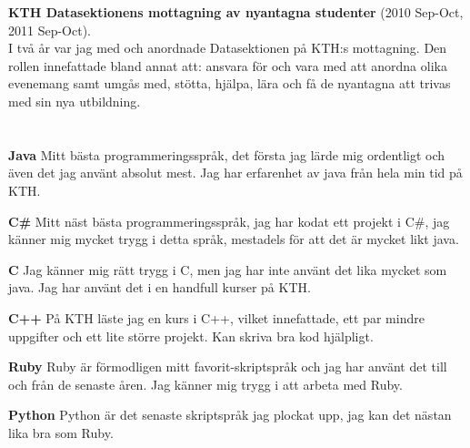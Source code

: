 \documentclass[margin,line]{resume}%
\begin{document}
\begin{resume}
		\textbf{KTH Datasektionens mottagning av nyantagna studenter} (2010
		Sep-Oct, 2011 Sep-Oct).\\
		I två år var jag med och anordnade Datasektionen på KTH:s mottagning. Den
		rollen innefattade bland annat att: ansvara för och vara med att anordna
		olika evenemang samt umgås med, stötta, hjälpa, lära och få de nyantagna att trivas
		med sin nya utbildning.

	   \section{}\vspace{0.001mm}

		\textbf{Java}\hspace{0.5cm}
		Mitt bästa programmeringsspråk, det första jag lärde mig ordentligt och
		även det jag använt absolut mest. Jag har erfarenhet av java från hela min
		tid på KTH.

		\textbf{C\#}\hspace{0.5cm}
		Mitt näst bästa programmeringsspråk, jag har kodat ett projekt i C\#,
		jag känner mig mycket trygg i detta språk,
		mestadels för att det är mycket likt java.

		\textbf{C}\hspace{0.5cm}
		Jag känner mig rätt trygg i C, men jag har inte använt det lika mycket som
		java. Jag har använt det i en handfull kurser på KTH.

		\textbf{C++}\hspace{0.5cm}
		På KTH läste jag en kurs i C++, vilket innefattade, ett par mindre
		uppgifter och ett lite större projekt. Kan skriva bra kod hjälpligt.

		\textbf{Ruby}\hspace{0.5cm}
		Ruby är förmodligen mitt favorit-skriptspråk och jag har använt det till
		och från de senaste åren. Jag känner mig trygg i att arbeta med Ruby.

		\textbf{Python}\hspace{0.5cm}
		Python är det senaste skriptspråk jag plockat upp, jag kan det nästan lika
		bra som Ruby.

	   \section{}\vspace{0.001mm}


\end{resume}
\end{document}
